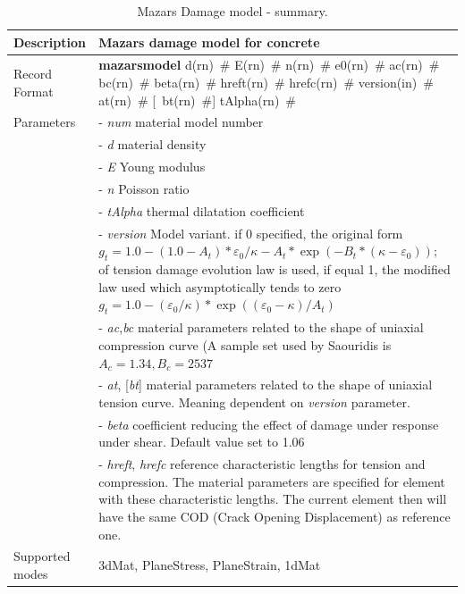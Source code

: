 \documentclass[epsf,a4paper]{article}
\newcommand{\descitem}[1]{{\noindent \bf #1}}
\newcommand{\elemparam}[2]{{{#1\tiny (#2)}~\#}}
\newcommand{\optelemparam}[2]{[{~\elemparam{#1}{#2}}]}
\newcommand{\param}[1]{{\it #1}}
\newcommand{\optparam}[1]{[{\it #1}]}
\begin{document}
\begin{table}[h]                                                                
\begin{tabular}{|l|p{9cm}|}                                                      
\hline                                                                          
Description & Mazars damage model for concrete\\
\hline                                                                          
Record Format & \descitem{mazarsmodel} \elemparam{d}{rn} \elemparam{E}{rn}
\elemparam{n}{rn}  \elemparam{e0}{rn}
\elemparam{ac}{rn} \elemparam{bc}{rn} \elemparam{beta}{rn}
\elemparam{hreft}{rn} \elemparam{hrefc}{rn} 
\elemparam{version}{in} \elemparam{at}{rn} \optelemparam{bt}{rn}
\elemparam{tAlpha}{rn} \\
Parameters &- \param{num} material model number\\
&- \param{d} material density\\
&- \param{E} Young modulus\\
&- \param{n} Poisson ratio\\
&- \param{tAlpha} thermal dilatation coefficient\\
&- \param{version} Model variant. if 0 specified, the original form 
$g_t   = 1.0-(1.0-A_t)*\varepsilon_0/\kappa - A_t*\exp(-B_t*(\kappa-\varepsilon_0));
$ of
tension damage evolution law is used, if equal 1, the modified law
used which asymptotically tends to zero 
$g_t = 1.0-(\varepsilon_0/\kappa)*\exp((\varepsilon_0-\kappa)/A_t)$\\
&- \param{ac},\param{bc} material parameters related to the shape of
uniaxial compression curve (A sample set used by Saouridis is $A_c =
1.34, B_c = 2537$\\
&- \param{at}, \optparam{bt} material parameters related to the shape of
uniaxial tension curve. Meaning dependent on \param{version}
parameter.\\
&- \param{beta} coefficient reducing the effect of damage under
response under shear. Default value set to 1.06\\
&- \param{hreft}, \param{hrefc} reference characteristic lengths for
tension and compression. The material parameters are specified for
element with these characteristic lengths. The current element then
will have the same COD (Crack Opening Displacement) as reference one.\\
Supported modes& 3dMat, PlaneStress, PlaneStrain, 1dMat\\
\hline
\end{tabular}                                                                   
\caption{Mazars Damage model  - summary.}                
\label{maz_table}                                                         
\end{table}                                                                     
\end{document}

